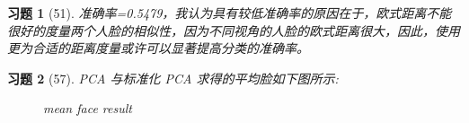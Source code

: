 \documentclass[a4paper, UTF8]{ctexart}
\newtheorem*{exercise}{\textbf{习题}}
\begin{document}
  \begin{exercise}[51]
    准确率=\rm{0.5479}，我认为具有较低准确率的原因在于，欧式距离不能很好的度量两个人脸的相似性，因为不同视角的人脸的欧式距离很大，因此，使用更为合适的距离度量或许可以显著提高分类的准确率。
  \end{exercise}
  \begin{exercise}[57]
    \rm{PCA} 与标准化 \rm{PCA} 求得的平均脸如下图所示:
    \begin{figure}[htbp!]
      \centering
      \caption{mean face result}
    \end{figure}
  \end{exercise}
\end{document}
